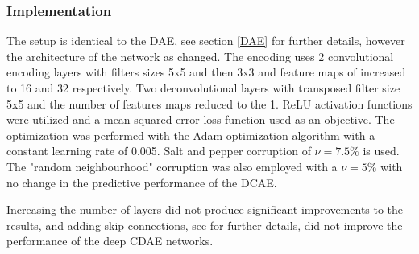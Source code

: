 \documentclass[10pt,conference,compsocconf]{IEEEtran}
\begin{document}
\subsubsection{Implementation}

The setup is identical to the DAE, see section \ref{DAE} for further details, however the architecture of the network as changed. The encoding uses 2 convolutional encoding layers with filters sizes 5x5 and then 3x3 and feature maps of increased to 16 and 32 respectively. Two deconvolutional layers with transposed filter size 5x5 and the number of features maps reduced to the 1. ReLU activation functions were utilized and a mean squared error loss function used as an objective. The optimization was performed with the Adam optimization algorithm with a constant learning rate of 0.005. Salt and pepper corruption of $\nu=7.5\%$ is used. The "random neighbourhood" corruption was also employed with a $\nu=5\%$ with no change in the predictive performance of the DCAE.

Increasing the number of layers did not produce significant improvements to the results, and adding skip connections, see \cite{DBLP:journals/corr/MaoSY16a} for further details, did not improve the performance of the deep CDAE networks.
\end{document}
